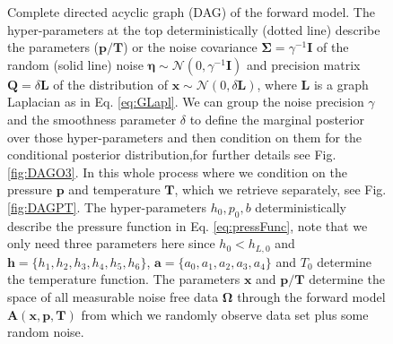 \begin{figure}[thb!]
	\caption[Complete directed acyclic graph of the forward model.]{Complete directed acyclic graph (DAG) of the forward model. The hyper-parameters at the top deterministically (dotted line) describe the parameters ($\bm{p}/\bm{T}$) or the noise covariance $\bm{\Sigma} = \gamma^{-1} \bm{I}$ of the random (solid line) noise $\bm{\eta} \sim \mathcal{N}(0,\gamma^{-1} \bm{I} ) $ and precision matrix $\bm{Q} = \delta \bm{L}$ of the distribution of $\bm{x}\sim \mathcal{N}(0,\delta \bm{L}) $, where $\bm{L}$ is a graph Laplacian as in Eq. \ref{eq:GLapl}. We can group the noise precision $\gamma$  and the smoothness parameter $\delta$ to define the marginal posterior over those hyper-parameters and then condition on them for the conditional posterior distribution,for further details see Fig. \ref{fig:DAGO3}. In this whole process where we condition on the pressure $\bm{p}$ and temperature $\bm{T}$, which we retrieve separately, see Fig. \ref{fig:DAGPT}. The hyper-parameters $h_0,p_0,b$ deterministically describe the pressure function in Eq. \ref{eq:pressFunc}, note that we only need three parameters here since $h_0< h_{L,0}$ and $\bm{h}= \{ h_1, h_2,h_3,h_4,h_5,h_6\}$, $\bm{a} = \{ a_0, a_1, a_2,a_3,a_4\}$ and $T_0$ determine the temperature function.
		The parameters $\bm{x}$ and $\bm{p}/ \bm{T}$ determine the space of all measurable noise free data $\bm{\Omega}$ through the forward model $\bm{A}(\bm{x},\bm{p},\bm{T})$ from which we randomly observe data set plus some random noise.}
	\label{fig:DAGComplete}
\end{figure}

